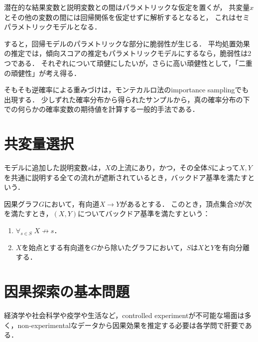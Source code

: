 \documentclass[uplatex,dvipdfmx]{jsreport}
\begin{document}
潜在的な結果変数と説明変数との間はパラメトリックな仮定を置くが，
共変量$x$とその他の変数の間には回帰関係を仮定せずに解析するとなると，
これはセミパラメトリックモデルとなる．

すると，回帰モデルのパラメトリックな部分に脆弱性が生じる．
平均処置効果の推定では，傾向スコアの推定もパラメトリックモデルにするなら，脆弱性は2つである．
それぞれについて頑健にしたいが，さらに高い頑健性として，「二重の頑健性」が考え得る．

\begin{discussion}
    そもそも逆確率による重みづけは，モンテカルロ法のimportance samplingでも出現する．
    少しずれた確率分布から得られたサンプルから，真の確率分布の下での何らかの確率変数の期待値を計算する一般的手法である．
\end{discussion}

\section{共変量選択}

\begin{tcolorbox}[colframe=ForestGreen, colback=ForestGreen!10!white,breakable,colbacktitle=ForestGreen!40!white,coltitle=black,fonttitle=\bfseries\sffamily,
title=]
    モデルに追加した説明変数$s$は，$X$の上流にあり，かつ，その全体$S$によって$X,Y$を共通に説明する全ての流れが遮断されているとき，バックドア基準を満たすという．
\end{tcolorbox}

\begin{definition}[バックドア基準]
    因果グラフ$G$において，有向道$X\to Y$があるとする．
    このとき，頂点集合$S$が次を満たすとき，$(X,Y)$についてバックドア基準を満たすという：
    \begin{enumerate}
        \item $\forall_{s\in S}\;X\not\to s$．
        \item $X$を始点とする有向道を$G$から除いたグラフにおいて，$S$は$X$と$Y$を有向分離する．
    \end{enumerate}
\end{definition}

\section{因果探索の基本問題}

\begin{tcolorbox}[colframe=ForestGreen, colback=ForestGreen!10!white,breakable,colbacktitle=ForestGreen!40!white,coltitle=black,fonttitle=\bfseries\sffamily,
title=]
    経済学や社会科学や疫学や生活など，controlled experimentが不可能な場面は多く，non-experimentalなデータから因果効果を推定する必要は各学問で肝要である．
\end{tcolorbox}
\end{document}
